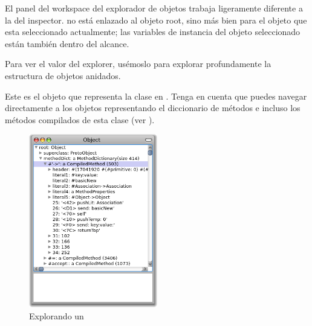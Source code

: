 \documentclass[spanish,a4paper,10pt,twoside]{book}
\begin{document}
El panel del workspace del explorador de objetos trabaja ligeramente diferente a la del inspector.
 no est\'a enlazado al objeto root, sino m\'as bien para el objeto que esta seleccionado actualmente; las variables de instancia del objeto seleccionado est\'an tambi\'en dentro del alcance.

Para ver el valor del explorer, us\'emoslo para explorar profundamente la estructura de objetos anidados.

Este es el objeto que representa la clase  en \pharo.
Tenga en cuenta que puedes navegar directamente a los objetos representando el diccionario de m\'etodos e incluso los m\'etodos compilados de esta clase (ver ).

\begin{figure}[tbp]
	\begin{center}
		\includegraphics[width=0.5\textwidth]{ExploreObject}
	\end{center}
	\caption{Explorando un }
\end{figure}

%
\end{document}
